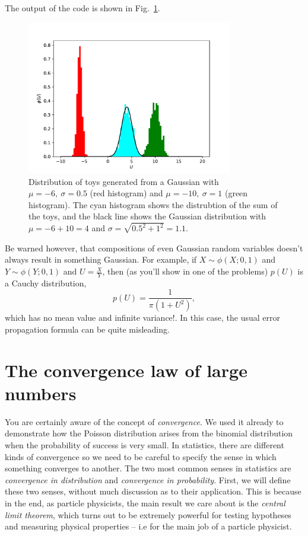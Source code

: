 The output of the code is shown in Fig.~\ref{fig:gaussiansum}. 
\begin{figure}[hbt!]
    \centering
    \includegraphics[width=0.8\textwidth]{figures/Probability/GaussianSum.pdf}
    \caption{Distribution of toys generated from a Gaussian with $\mu=-6,~\sigma=0.5$ (red histogram) and $\mu=-10,~\sigma=1$ (green histogram). The cyan histogram shows the distrubtion of the sum of the toys, and the black line shows the Gaussian distribution with $\mu=-6+10=4$ and $\sigma=\sqrt{0.5^2+1^2}=1.1$. }
    \label{fig:gaussiansum}
\end{figure}
Be warned however, that compositions of even Gaussian random variables doesn't always result in something Gaussian. For example, if $X\sim \phi(X;0,1)$ and $Y\sim \phi(Y;0,1)$ and $U=\frac{X}{Y}$, then (as you'll show in one of the problems) $p(U)$ is a Cauchy distribution, 
\begin{equation}
    p(U) = \dfrac{1}{\pi(1+U^{2})},
\end{equation}
which has no mean value and infinite variance!. In this case, the usual error propagation formula can be quite misleading. 
 

\section{The convergence law of large numbers}

You are certainly aware of the concept of \emph{convergence}. We used it already to demonstrate how the Poisson distribution arises from the binomial distribution when the probability of success is very small. In statistics, there are different kinds of convergence so we need to be careful to specify the sense in which something converges to another. The two most common senses in statistics are \emph{convergence in distribution} and \emph{convergence in probability}. First, we will define these two senses, without much discussion as to their application. This is because in the end, as particle physicists, the main result we care about is the \emph{central limit theorem}, which turns out to be extremely powerful for testing hypotheses and measuring physical properties -- i.e for the main job of a particle physicist. 
